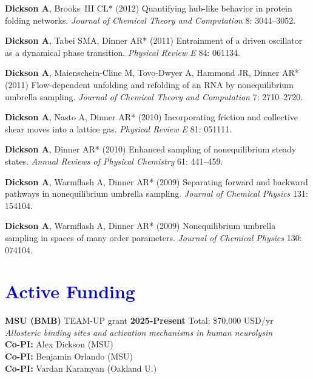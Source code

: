 \documentclass[margin,line]{res}
\begin{document}
\begin{resume}
\begin{spacing}{1.2}
\begin{thebibliography}{10}
{\bf Dickson A}, Brooks~{III} CL* (2012) Quantifying hub-like behavior in protein
  folding networks.
\newblock \textit{Journal of Chemical Theory and Computation} 8: 3044--3052.

{\bf Dickson A}, Tabei SMA, Dinner AR* (2011) {Entrainment of a driven oscillator as a
  dynamical phase transition}.
\newblock \textit{Physical Review E} 84: 061134.

{\bf Dickson A}, Maienschein-Cline M, Tovo-Dwyer A, Hammond JR, Dinner AR* (2011)
  Flow-dependent unfolding and refolding of an {RNA} by nonequilibrium umbrella
  sampling.
\newblock \textit{Journal of Chemical Theory and Computation} 7: 2710--2720.

{\bf Dickson A}, Nasto A, Dinner AR* (2010) {Incorporating friction and collective
  shear moves into a lattice gas.}
\newblock \textit{Physical Review E} 81: 051111.

{\bf Dickson A}, Dinner AR* (2010) Enhanced sampling of nonequilibrium steady states.
\newblock \textit{Annual Reviews of Physical Chemistry} 61: 441--459.

{\bf Dickson A}, Warmflash A, Dinner AR* (2009) Separating forward and backward
  pathways in nonequilibrium umbrella sampling.
\newblock \textit{Journal of Chemical Physics} 131: 154104.

{\bf Dickson A}, Warmflash A, Dinner AR* (2009) Nonequilibrium umbrella sampling in
  spaces of many order parameters.
\newblock \textit{Journal of Chemical Physics} 130: 074104.

\end{thebibliography}
\end{spacing}
\endgroup

\section{\sc \textcolor{blue}{Active Funding} }

{\bf MSU (BMB)} TEAM-UP grant \hfill {\bf 2025-Present} Total: \$70,000 USD/yr \\
\emph{Allosteric binding sites and activation mechanisms in human neurolysin} \\
     {\bf Co-PI:} Alex Dickson (MSU)\\
     {\bf Co-PI:} Benjamin Orlando (MSU)\\
     {\bf Co-PI:} Vardan Karamyan (Oakland U.)


\end{resume}
\end{document}
